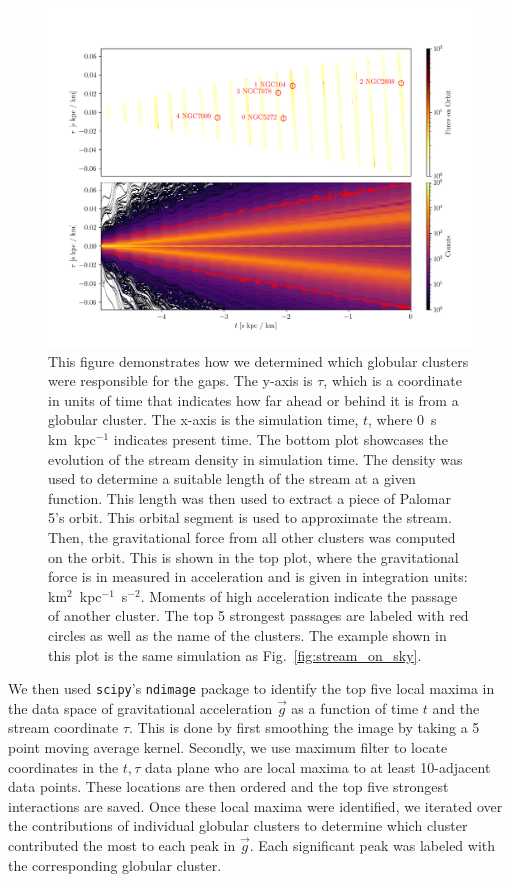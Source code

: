 \documentclass{aa}
\begin{document}
\begin{appendix}
    \begin{figure}
      \centering
      \includegraphics[width=\linewidth]{force_on_orbit-monte-carlo-009.png}
      \caption{This figure demonstrates how we determined which globular clusters were responsible for the gaps. The y-axis is $\tau$, which is a coordinate in units of time that indicates how far ahead or behind it is from a globular cluster. The x-axis is the simulation time, $t$, where 0~s km~kpc$^{-1}$ indicates present time.  The bottom plot showcases the evolution of the stream density in simulation time. The density was used to determine a suitable length of the stream at a given function. This length was then used to extract a piece of Palomar 5's orbit. This orbital segment is used to approximate the stream. Then, the gravitational force from all other clusters was computed on the orbit. This is shown in the top plot, where the gravitational force is in measured in acceleration and is given in integration units: km$^2$~kpc$^{-1}$~s$^{-2}$. Moments of high acceleration indicate the passage of another cluster. The top 5 strongest passages are labeled with red circles as well as the name of the clusters. The example shown in this plot is the same simulation as Fig.~\ref{fig:stream_on_sky}.}
      \label{fig:force-on-orbit}
    \end{figure}  


    We then used \texttt{scipy}'s \texttt{ndimage} \citep{2020NatMe..17..261V} package to identify the top five local maxima in the data space of gravitational acceleration $\vec{g}$ as a function of time $t$ and the stream coordinate $\tau$. This is done by first smoothing the image by taking a 5 point moving average kernel. Secondly, we use maximum filter to locate coordinates in the $t,\tau$ data plane who are local maxima to at least 10-adjacent data points. These locations are then ordered and the top five strongest interactions are saved. Once these local maxima were identified, we iterated over the contributions of individual globular clusters to determine which cluster contributed the most to each peak in $\vec{g}$. Each significant peak was labeled with the corresponding globular cluster.



\end{appendix}
\end{document}
